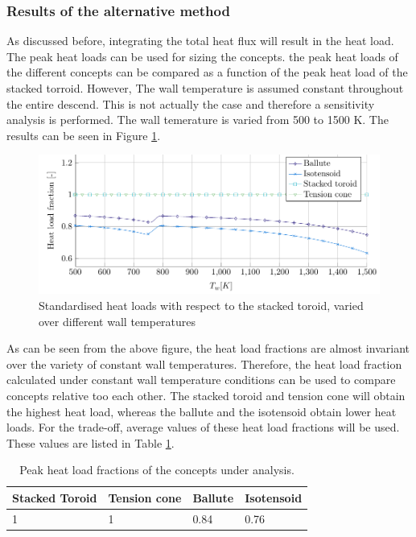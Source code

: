 \subsubsection{Results of the alternative method}
As discussed before, integrating the total heat flux will result in the heat load. The peak heat loads can be used for sizing the concepts. the peak heat loads of the different concepts can be compared as a function of the peak heat load of the stacked torroid. However, The wall temperature is assumed constant throughout the entire descend. This is not actually the case and therefore a sensitivity analysis is performed. The wall temerature is varied from 500 to 1500 K. The results can be seen in Figure \ref{fig:heatload}.

\begin{figure}[H]
	\centering
	\includegraphics{Figure/heatload.pdf}
	\caption{Standardised heat loads with respect to the stacked toroid, varied over different wall temperatures}
	\label{fig:heatload}
\end{figure}

As can be seen from the above figure, the heat load fractions are almost invariant over the variety of constant wall temperatures. Therefore, the heat load fraction calculated under constant wall temperature conditions can be used to compare concepts relative too each other. The stacked toroid and tension cone will obtain the highest heat load, whereas the ballute and the isotensoid obtain lower heat loads. For the trade-off, average values of these heat load fractions will be used. These values are listed in Table \ref{tab:fractions}.

\begin{table}[H]
	\centering
	\caption {Peak heat load fractions of the concepts under analysis.}
	\begin{tabular}{|l|l|l|l|}
		\hline
		Stacked Toroid & Tension cone & Ballute & Isotensoid \\ \hline
		1              & 1            & 0.84    & 0.76       \\ \hline
	\end{tabular}
	\label{tab:fractions}
\end{table}

